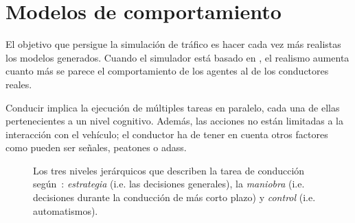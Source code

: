 \chapter{Modelos de comportamiento}
\label{ch:sota-behavior-models}

El objetivo que persigue la simulación de tráfico es hacer cada vez más realistas los modelos generados. Cuando el simulador está basado en , el realismo aumenta cuanto más se parece el comportamiento de los agentes al de los conductores reales.

Conducir implica la ejecución de múltiples tareas en paralelo, cada una de ellas pertenecientes a un nivel cognitivo. Además, las acciones no están limitadas a la interacción con el vehículo; el conductor ha de tener en cuenta otros factores como pueden ser señales, peatones o \glspl{adas}.

\begin{figure}
	\centering
	\caption[Los tres niveles jerárquicos de conducción según~\cite{michon1985critical}]{Los tres niveles jerárquicos que describen la tarea de conducción según~\cite{michon1985critical}: \textit{estrategia} (i.e. las decisiones generales), la \textit{maniobra} (i.e. decisiones durante la conducción de más corto plazo) y \textit{control} (i.e. automatismos).}
	\label{fig:three-levels-of-human-driving}
\end{figure}

